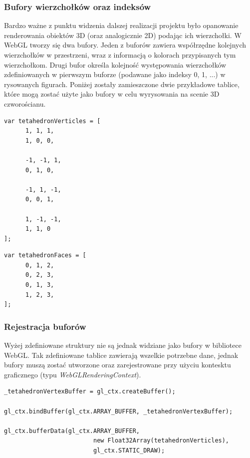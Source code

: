\documentclass[a4paper,11pt]{article}
\begin{document}
\subsubsection{Bufory wierzchołków oraz indeksów}

Bardzo ważne z punktu widzenia dalszej realizacji projektu było opanowanie renderowania obiektów 3D (oraz analogicznie 2D) podając ich wierzchołki. W WebGL tworzy się dwa bufory. Jeden z buforów zawiera współrzędne kolejnych wierzchołków w przestrzeni, wraz z informacją o kolorach przypisanych tym wierzchołkom. Drugi bufor określa kolejność występowania wierzchołków zdefiniowanych w pierwszym buforze (podawane jako indeksy 0, 1, ...) w rysowanych figurach. Poniżej zostały zamieszczone dwie przykładowe tablice, które mogą zostać użyte jako bufory w celu wyrysowania na scenie 3D czworościanu.

\begin{lstlisting}[caption=Definicja tablicy opisującej bufor wierzchołków dla czworościanu]
var tetahedronVerticles = [
      1, 1, 1,
      1, 0, 0,

      -1, -1, 1,
      0, 1, 0,

      -1, 1, -1,
      0, 0, 1,

      1, -1, -1,
      1, 1, 0
];
\end{lstlisting}

\begin{lstlisting}[caption=Definicja tablicy opisującej bufor indeksów dla czworościanu]
  var tetahedronFaces = [
      0, 1, 2,
      0, 2, 3,
      0, 1, 3,
      1, 2, 3,
];
\end{lstlisting}

\subsubsection{Rejestracja buforów}

Wyżej zdefiniowane struktury nie są jednak widziane jako bufory w bibliotece WebGL. Tak zdefiniowane tablice zawierają wszelkie potrzebne dane, jednak bufory muszą zostać utworzone oraz zarejestrowane przy użyciu kontesktu graficznego (typu \textit{WebGLRenderingContext}).

\begin{lstlisting}[caption=Utworzenie oraz przypięcie bufora wierzchołków]
_tetahedronVertexBuffer = gl_ctx.createBuffer();

gl_ctx.bindBuffer(gl_ctx.ARRAY_BUFFER, _tetahedronVertexBuffer);

gl_ctx.bufferData(gl_ctx.ARRAY_BUFFER, 
                         new Float32Array(tetahedronVerticles),
                         gl_ctx.STATIC_DRAW);
\end{lstlisting}
\end{document}

